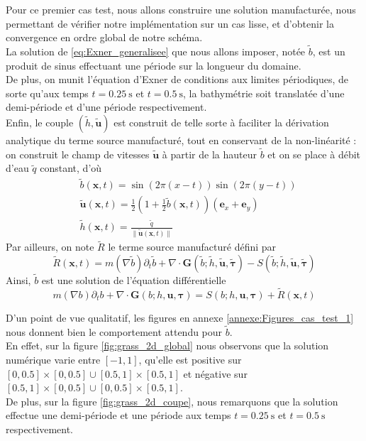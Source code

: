 \documentclass[11pt, a4paper, oneside]{report}
\begin{document}
Pour ce premier cas test, nous allons construire une solution manufacturée, nous permettant de vérifier notre implémentation sur un cas lisse, et d'obtenir la convergence en ordre global de notre schéma. \\
La solution de \eqref{eq:Exner_generalisee} que nous allons imposer, notée $\widetilde{b}$, est un produit de sinus effectuant une période sur la longueur du domaine. \\
De plus, on munit l'équation d'Exner de conditions aux limites périodiques, de sorte qu'aux temps $t = \SI{0.25}{\second}$ et $t = \SI{0.5}{\second}$, la bathymétrie soit translatée d'une demi-période et d'une période respectivement. \\
Enfin, le couple $(\widetilde{h}, \bm{\widetilde{u}})$ est construit de telle sorte à faciliter la dérivation analytique du terme source manufacturé, tout en conservant de la non-linéarité : on construit le champ de vitesses $\bm{\widetilde{u}}$ à partir de la hauteur $\widetilde{b}$ et on se place à débit d'eau $\widetilde{q}$ constant, d'où
\begin{equation}
    \begin{aligned}
        & \widetilde{b}(\bm{x}, t) = \sin \left( 2 \pi (x - t) \right) \sin \left( 2 \pi (y - t) \right) \\
        & \bm{\widetilde{u}}(\bm{x}, t) = \frac{1}{2} \left( 1 + \frac{1}{2} \widetilde{b}(\bm{x}, t) \right) (\bm{e}_x + \bm{e}_y) \\
        & \widetilde{h}(\bm{x}, t) = \frac{\widetilde{q}}{\| \bm{\widetilde{u}}(\bm{x}, t) \|}
    \end{aligned}
\end{equation}
Par ailleurs, on note $\widetilde{R}$ le terme source manufacturé défini par
\begin{equation}
    \widetilde{R}(\bm{x}, t) = m(\nabla \widetilde{b}) \partial_t \widetilde{b} + \nabla \cdot \bm{G} \left( \widetilde{b}; \widetilde{h}, \bm{\widetilde{u}}, \bm{\widetilde{\tau}} \right) - S \left( \widetilde{b}; \widetilde{h}, \bm{\widetilde{u}}, \bm{\widetilde{\tau}} \right)
\end{equation}
Ainsi, $\widetilde{b}$ est une solution de l'équation différentielle
\begin{equation}
    m(\nabla b) \partial_t b + \nabla \cdot \bm{G} \left( b; h, \bm{u}, \bm{\tau} \right) = S \left( b; h, \bm{u}, \bm{\tau} \right) + \widetilde{R}(\bm{x}, t)
\end{equation}

D'un point de vue qualitatif, les figures en annexe \ref{annexe:Figures_cas_test_1} nous donnent bien le comportement attendu pour $\widetilde{b}$. \\
En effet, sur la figure \ref{fig:grass_2d_global} nous observons que la solution numérique varie entre $[-1, 1]$, qu'elle est positive sur $[0, 0.5] \times [0, 0.5] \cup  [0.5, 1] \times [0.5, 1]$ et négative sur $[0.5, 1] \times [0, 0.5] \cup  [0, 0.5] \times [0.5, 1]$. \\
De plus, sur la figure \ref{fig:grass_2d_coupe}, nous remarquons que la solution effectue une demi-période et une période aux temps $t = \SI{0.25}{\second}$ et $t = \SI{0.5}{\second}$ respectivement.
\end{document}

